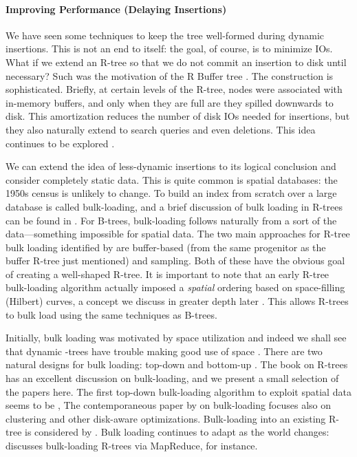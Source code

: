 \paragraph{Improving Performance (Delaying Insertions)}
We have seen some techniques to keep the tree well-formed during dynamic insertions.
This is not an end to itself: the goal, of course, is to minimize IOs.
What if we extend an R-tree so that we do not commit an insertion to disk until necessary?
Such was the motivation of the R Buffer tree \cite{argehinrichsvahrenholdvitter99}.
The construction is sophisticated.
Briefly, at certain levels of the R-tree, nodes were associated with in-memory buffers, and only when they are full are they spilled downwards to disk.
This amortization reduces the number of disk IOs needed for insertions, but they also naturally extend to search queries and even deletions.
This idea continues to be explored \cite{biveinissaltenisjensen07}.

We can extend the idea of less-dynamic insertions to its logical conclusion and consider completely static data.
This is quite common is spatial databases: the 1950s census is unlikely to change.
To build an index from scratch over a large database is called bulk-loading, and a brief discussion of bulk loading in R-trees can be found in \cite{berckenseeger01}.
For B-trees, bulk-loading follows naturally from a sort of the data---something impossible for spatial data.
The two main approaches for R-tree bulk loading identified by \cite{berckenseeger01} are buffer-based (from the same progenitor as the buffer R-tree just mentioned) and sampling.
Both of these have the obvious goal of creating a well-shaped R-tree.
It is important to note that an early R-tree bulk-loading algorithm actually imposed a \emph{spatial} ordering based on space-filling (Hilbert) curves, a concept we discuss in greater depth later \cite{kamelfaloutsos94}.
This allows R-trees to bulk load using the same techniques as B-trees.

Initially, bulk loading was motivated by space utilization \cite{garcialopezleutenegger98,kamelfaloutsos94} and indeed we shall see that dynamic \rbase-trees have trouble making good use of space \cite{huanglinlin01}.
There are two natural designs for bulk loading: top-down and bottom-up \cite{thebook}.
The book on R-trees \cite{thebook} has an excellent discussion on bulk-loading, and we present a small selection of the papers here.
The first top-down bulk-loading algorithm to exploit spatial data seems to be \cite{garcialopezleutenegger98},
The contemporaneous paper by \cite{berchtoldbohmkriegel98} on bulk-loading focuses also on clustering and other disk-aware optimizations.
Bulk-loading into an existing R-tree is considered by \cite{chenchoubeyrundensteiner98}.
Bulk loading continues to adapt as the world changes: \cite{tanluomaoni12} discusses bulk-loading R-trees via MapReduce, for instance.


